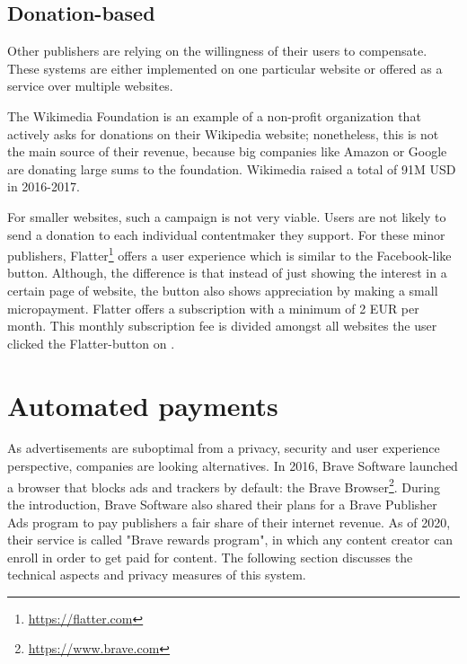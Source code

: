 \subsection{Donation-based}

Other publishers are relying on the willingness of their users to compensate. These systems are either implemented on one particular website or offered as a service over multiple websites.

The Wikimedia Foundation is an example of a non-profit organization that actively asks for donations on their Wikipedia website; nonetheless, this is not the main source of their revenue, because big companies like Amazon or Google are donating large sums to the foundation. Wikimedia raised a total of 91M USD in 2016-2017. \cite{wikimediadonation}

For smaller websites, such a campaign is not very viable. Users are not likely to send a donation to each individual contentmaker they support. For these minor publishers, Flatter\footnote{\url{https://flatter.com}} offers a user experience which is similar to the Facebook-like button. Although, the difference is that instead of just showing the interest in a certain page of website, the button also shows appreciation by making a small micropayment. Flatter offers a subscription with a minimum of 2 EUR per month. This monthly subscription fee is divided amongst all websites the user clicked the Flatter-button on \cite{loll2010flattr}.

\section{Automated payments}
As advertisements are suboptimal from a privacy, security and user experience perspective, companies are looking alternatives. In 2016, Brave Software launched a browser that blocks ads and trackers by default: the Brave Browser\footnote{\url{https://www.brave.com}}. During the introduction, Brave Software also shared their plans for a Brave Publisher Ads program to pay publishers a fair share of their internet revenue. As of 2020, their service is called "Brave rewards program", in which any content creator can enroll in order to get paid for content. The following section discusses the technical aspects and privacy measures of this system.

